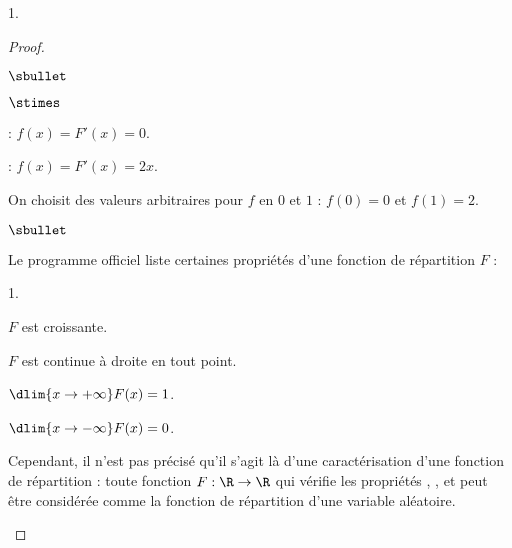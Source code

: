 \begin{noliste}{1.}
\begin{proof}
\begin{noliste}{$\sbullet$}
\begin{noliste}{$\stimes$}
	\item \dashuline{Si $x\in \ ]1,+\infty[$} : 
	$f(x)=F'(x)=0$.\\[-.3cm]
	
      \item \dashuline{Si $x\in \ ]0,1[$} : $f(x)=F'(x)=2x$.\\[-.3cm]
	
	\item On choisit des valeurs arbitraires pour $f$ en $0$ et $1$ 
	: $f(0)=0$ et $f(1)=2$.
	\end{noliste}
      \end{noliste}
	
\begin{remark}%
  \begin{noliste}{$\sbullet$}
  \item Le programme officiel liste certaines propriétés d'une fonction 
  de répartition $F$ :
    \begin{noliste}{\scriptsize 1.}
    \item $F$ est croissante.
    \item $F$ est continue à droite en tout point.
    \item $\dlim{x\to+\infty} F(x)=1$.
    \item $\dlim{x\to-\infty} F(x)=0$.
    \end{noliste}
    Cependant, il n'est pas précisé qu'il s'agit là d'une
    caractérisation d'une fonction de répartition : toute fonction $F
    : \R \to \R$ qui vérifie les propriétés , ,
     et  peut être considérée comme la fonction de
    répartition d'une variable aléatoire.


\end{noliste}
\end{remark}
\end{proof}
\end{noliste}
